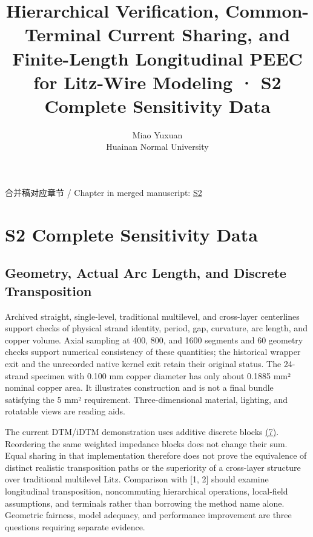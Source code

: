 \documentclass[11pt]{article}
\begin{document}
\title{Hierarchical Verification, Common-Terminal Current Sharing, and Finite-Length Longitudinal PEEC for Litz-Wire Modeling · S2 Complete Sensitivity Data}
\author{Miao Yuxuan\\Huainan Normal University}
\date{}
\maketitle
\noindent 合并稿对应章节 / Chapter in merged manuscript: \href{paper_en_single.pdf#chapter-S2}{S2}\par
\FloatBarrier
\section*{S2 Complete Sensitivity Data}
\hypertarget{chapter-S2}{}
\subsection*{Geometry, Actual Arc Length, and Discrete Transposition}
\hypertarget{S2.geometry.heading}{}
Archived straight, single-level, traditional multilevel, and cross-layer centerlines support checks of physical strand identity, period, gap, curvature, arc length, and copper volume. Axial sampling at 400, 800, and 1600 segments and 60 geometry checks support numerical consistency of these quantities; the historical wrapper exit and the unrecorded native kernel exit retain their original status. The 24-strand specimen with 0.100 mm copper diameter has only about 0.1885 mm² nominal copper area. It illustrates construction and is not a final bundle satisfying the 5 mm² requirement. Three-dimensional material, lighting, and rotatable views are reading aids.


The current DTM/iDTM demonstration uses additive discrete blocks \href{paper_en_single.pdf#E06}{(7)}. Reordering the same weighted impedance blocks does not change their sum. Equal sharing in that implementation therefore does not prove the equivalence of distinct realistic transposition paths or the superiority of a cross-layer structure over traditional multilevel Litz. Comparison with [1, 2] should examine longitudinal transposition, noncommuting hierarchical operations, local-field assumptions, and terminals rather than borrowing the method name alone. Geometric fairness, model adequacy, and performance improvement are three questions requiring separate evidence.
\end{document}
